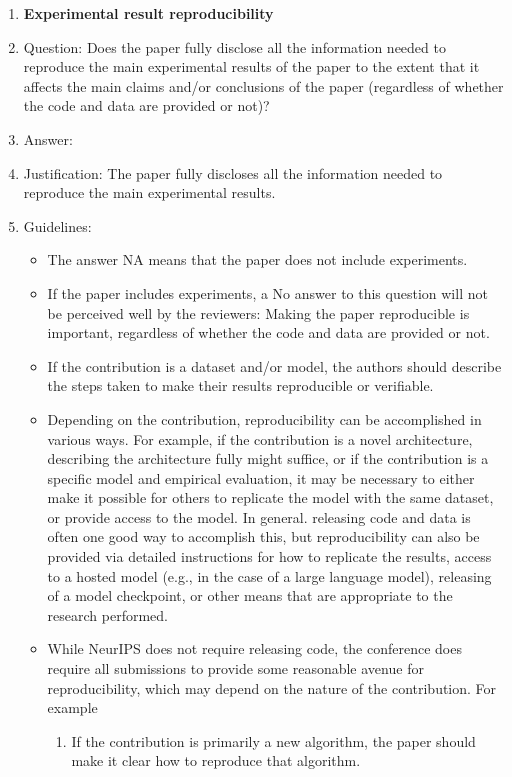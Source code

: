 \documentclass{article}
\numberwithin{equation}{section}
\theoremstyle{definition}
\begin{document}
\begin{enumerate}
    \item {\bf Experimental result reproducibility}
    \item[] Question: Does the paper fully disclose all the information needed to reproduce the main experimental results of the paper to the extent that it affects the main claims and/or conclusions of the paper (regardless of whether the code and data are provided or not)?
    \item[] Answer: \answerYes{} %
    \item[] Justification: The paper fully discloses all the information needed to reproduce the main experimental results.
    \item[] Guidelines:
    \begin{itemize}
        \item The answer NA means that the paper does not include experiments.
        \item If the paper includes experiments, a No answer to this question will not be perceived well by the reviewers: Making the paper reproducible is important, regardless of whether the code and data are provided or not.
        \item If the contribution is a dataset and/or model, the authors should describe the steps taken to make their results reproducible or verifiable. 
        \item Depending on the contribution, reproducibility can be accomplished in various ways. For example, if the contribution is a novel architecture, describing the architecture fully might suffice, or if the contribution is a specific model and empirical evaluation, it may be necessary to either make it possible for others to replicate the model with the same dataset, or provide access to the model. In general. releasing code and data is often one good way to accomplish this, but reproducibility can also be provided via detailed instructions for how to replicate the results, access to a hosted model (e.g., in the case of a large language model), releasing of a model checkpoint, or other means that are appropriate to the research performed.
        \item While NeurIPS does not require releasing code, the conference does require all submissions to provide some reasonable avenue for reproducibility, which may depend on the nature of the contribution. For example
        \begin{enumerate}
            \item If the contribution is primarily a new algorithm, the paper should make it clear how to reproduce that algorithm.

\end{enumerate}
\end{itemize}
\end{enumerate}
\end{document}
